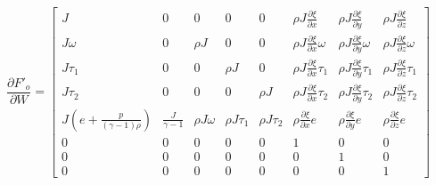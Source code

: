 \[\frac{{\partial {{F'}_o}}}{{\partial W}} = \left[ {\begin{array}{*{20}{c}}
J&0&0&0&0&{\rho J\frac{{\partial \xi }}{{\partial x}}}&{\rho J\frac{{\partial \xi }}{{\partial y}}}&{\rho J\frac{{\partial \xi }}{{\partial z}}}\\
{J\omega }&0&{\rho J}&0&0&{\rho J\frac{{\partial \xi }}{{\partial x}}\omega }&{\rho J\frac{{\partial \xi }}{{\partial y}}\omega }&{\rho J\frac{{\partial \xi }}{{\partial z}}\omega }\\
{J{\tau _1}}&0&0&{\rho J}&0&{\rho J\frac{{\partial \xi }}{{\partial x}}{\tau _1}}&{\rho J\frac{{\partial \xi }}{{\partial y}}{\tau _1}}&{\rho J\frac{{\partial \xi }}{{\partial z}}{\tau _1}}\\
{J{\tau _2}}&0&0&0&{\rho J}&{\rho J\frac{{\partial \xi }}{{\partial x}}{\tau _2}}&{\rho J\frac{{\partial \xi }}{{\partial y}}{\tau _2}}&{\rho J\frac{{\partial \xi }}{{\partial z}}{\tau _2}}\\
{J\left( {e + \frac{p}{{\left( {\gamma  - 1} \right)\rho }}} \right)}&{\frac{J}{{\gamma  - 1}}}&{\rho J\omega }&{\rho J{\tau _1}}&{\rho J{\tau _2}}&{\rho \frac{{\partial \xi }}{{\partial x}}e}&{\rho \frac{{\partial \xi }}{{\partial y}}e}&{\rho \frac{{\partial \xi }}{{\partial z}}e}\\
0&0&0&0&0&1&0&0\\
0&0&0&0&0&0&1&0\\
0&0&0&0&0&0&0&1
\end{array}} \right]\]

